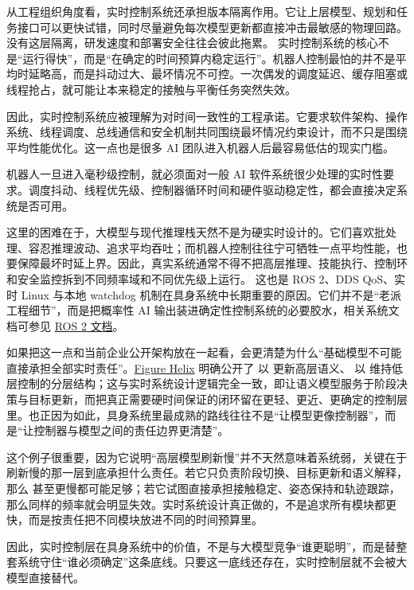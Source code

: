 从工程组织角度看，实时控制系统还承担版本隔离作用。它让上层模型、规划和任务接口可以更快试错，同时尽量避免每次模型更新都直接冲击最敏感的物理回路。没有这层隔离，研发速度和部署安全往往会彼此拖累。 实时控制系统的核心不是“运行得快”，而是“在确定的时间预算内稳定运行”。机器人控制最怕的并不是平均时延略高，而是抖动过大、最坏情况不可控。一次偶发的调度延迟、缓存阻塞或线程抢占，就可能让本来稳定的接触与平衡任务突然失效。

因此，实时控制系统应被理解为对时间一致性的工程承诺。它要求软件架构、操作系统、线程调度、总线通信和安全机制共同围绕最坏情况约束设计，而不只是围绕平均性能优化。这一点也是很多 AI 团队进入机器人后最容易低估的现实门槛。

机器人一旦进入毫秒级控制，就必须面对一般 AI 软件系统很少处理的实时性要求。调度抖动、线程优先级、控制器循环时间和硬件驱动稳定性，都会直接决定系统是否可用。

这里的困难在于，大模型与现代推理栈天然不是为硬实时设计的。它们喜欢批处理、容忍推理波动、追求平均吞吐；而机器人控制往往宁可牺牲一点平均性能，也要保障最坏时延上界。因此，真实系统通常不得不把高层推理、技能执行、控制环和安全监控拆到不同频率域和不同优先级上运行。 这也是 ROS 2、DDS QoS、实时 Linux 与本地 watchdog 机制在具身系统中长期重要的原因。它们并不是“老派工程细节”，而是把概率性 AI 输出装进确定性控制系统的必要胶水，相关系统文档可参见 \href{https://docs.ros.org/en/rolling/index.html}{ROS 2 文档}。

如果把这一点和当前企业公开架构放在一起看，会更清楚为什么“基础模型不可能直接承担全部实时责任”。\href{https://www.figure.ai/news/helix}{Figure Helix} 明确公开了 \texttt{} 以 \texttt{} 更新高层语义、\texttt{} 以 \texttt{} 维持低层控制的分层结构；这与实时系统设计逻辑完全一致，即让语义模型服务于阶段决策与目标更新，而把真正需要硬时间保证的闭环留在更轻、更近、更确定的控制层里。也正因为如此，具身系统里最成熟的路线往往不是“让模型更像控制器”，而是“让控制器与模型之间的责任边界更清楚”。

这个例子很重要，因为它说明“高层模型刷新慢”并不天然意味着系统弱，关键在于刷新慢的那一层到底承担什么责任。若它只负责阶段切换、目标更新和语义解释，那么 \texttt{} 甚至更慢都可能足够；若它试图直接承担接触稳定、姿态保持和轨迹跟踪，那么同样的频率就会明显失效。实时系统设计真正做的，不是追求所有模块都更快，而是按责任把不同模块放进不同的时间预算里。

因此，实时控制层在具身系统中的价值，不是与大模型竞争“谁更聪明”，而是替整套系统守住“谁必须确定”这条底线。只要这一底线还存在，实时控制层就不会被大模型直接替代。


